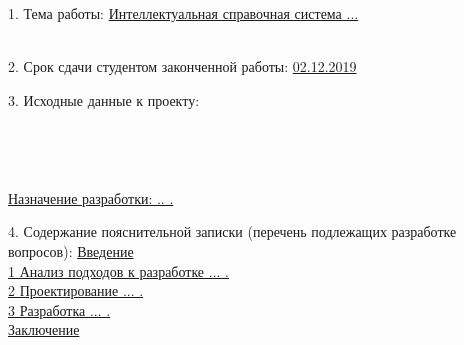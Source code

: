 {\begin{center}
  \end{center}

  1. Тема работы: \uline{Интеллектуальная справочная система ...}\lineunderscore\\
  \lineunderscore\\
  \vspace{1em}

  2. Срок сдачи студентом законченной работы: \uline{02.12.2019}\lineunderscore

  \vspace{1em}

  3. Исходные данные к проекту: 
  \lineunderscore\\
  \lineunderscore\\
  \lineunderscore\\
  \lineunderscore\\
  \lineunderscore\\
  \lineunderscore
  \uline{\hspace*{4ex}
  Назначение разработки: .. .}\lineunderscore

  \vspace{1em}

  4. Содержание пояснительной записки (перечень подлежащих разработке вопросов):
  \uline{\hspace*{2ex}Введение}\lineunderscore\\
  \uline{\hspace*{2ex}1 Анализ подходов к разработке ... .}\lineunderscore\\
  \uline{\hspace*{2ex}2 Проектирование ... .}\lineunderscore\\
  \uline{\hspace*{2ex}3 Разработка ... .}\lineunderscore\\
  \uline{\hspace*{2ex}Заключение}\lineunderscore\\
  \lineunderscore\\
  \lineunderscore\\
  \lineunderscore\\
  \lineunderscore\\
  \lineunderscore\\
  \lineunderscore\\
  \lineunderscore

}
